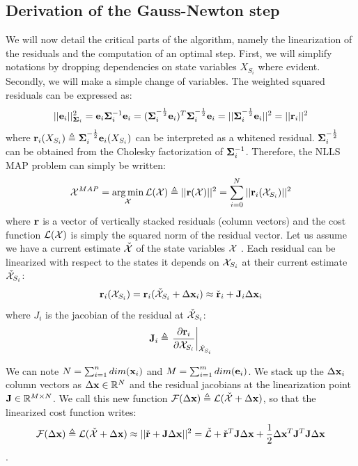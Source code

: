 \subsection{Derivation of the Gauss-Newton step}
We will now detail the critical parts of the algorithm, namely the linearization of the residuals and the computation of an optimal step.
First, we will simplify notations by dropping dependencies on state variables $X_{S_i}$ where evident. 
Secondly, we will make a simple change of variables. The weighted squared residuals can be expressed as:
%
\begin{equation}
    ||{\bf e}_i||^2_{{\bm \Sigma}_i} = {\bf e}_i {\bm \Sigma}_i^{-1} {\bf e}_i 
    = ({\bm \Sigma}_i^{-\frac{1}{2}}{\bf e}_i)^T{\bm \Sigma}_i^{-\frac{1}{2}}{\bf e}_i
    = ||{\bm \Sigma}_i^{-\frac{1}{2}}{\bf e}_i||^2 = ||{\bf r}_i||^2
\end{equation}
%
where ${\bf r}_i(X_{S_i}) \triangleq {\bm \Sigma}_i^{-\frac{1}{2}}{\bf e}_i(X_{S_i})$ can be interpreted as a whitened residual. ${\bm \Sigma}_i^{-\frac{1}{2}}$ can be obtained
from the Cholesky factorization of ${\bm \Sigma}_i^{-1}$. Therefore, the NLLS MAP problem can simply be written:
%
\begin{equation}
    \mathcal{X}^{MAP} = \operatorname*{arg\,min}_{\mathcal{X}} \mathcal{L}(\mathcal{X}) \triangleq||{\bf r}(\mathcal{X})||^2 = \sum_{i=0}^N ||{\bf r}_i({\mathcal{X}_{S_i}})||^2 
\end{equation}
%
where ${\bf r}$ is a vector of vertically stacked residuals (column vectors) and the cost function $\mathcal{L}(\mathcal{X})$ is simply the squared norm 
of the residual vector. Let us assume we have a current estimate $\check{\mathcal{X}}$ of the state variables $\mathcal{X}$ .
Each residual can be linearized with respect to the states it depends on $\mathcal{X}_{S_i}$ at their current estimate $\check{\mathcal{X}}_{S_i}$:
%
\begin{equation}
    {\bf r}_i(\mathcal{X}_{S_i}) = {\bf r}_i(\check{\mathcal{X}}_{S_i} + \Delta {\bf x}_i) \approx \check{{\bf r}}_i + {\bf J}_i \Delta {\bf x}_i
\end{equation}
%
where $J_i$ is the jacobian of the residual at $\check{\mathcal{X}}_{S_i}$: 
%
\begin{equation}
    {\bf J}_i \triangleq \left.\frac{\partial {\bf r}_i}{\partial \mathcal{X}_{S_i}}\right|_{\check{\mathcal{X}}_{S_i}}
    \label{eq:res_jacobian}
\end{equation}

We can note $N = \sum_{i=1}^{n}dim({\bf x}_i)$ and $M = \sum_{i=1}^{m}dim({\bf e}_i)$.
We stack up the $\Delta {\bf x}_i$ column vectors as $\Delta {\bf x} \in \mathbb{R}^N$ and the residual jacobians at the linearization point 
${\bf J} \in \mathbb{R}^{M \times N}$. We call this new function $\mathcal{F}(\Delta {\bf x}) \triangleq \mathcal{L}(\check{\mathcal{X}} + \Delta {\bf x})$, so that the linearized cost function writes:  
%
\begin{equation}
    \mathcal{F}(\Delta {\bf x}) \triangleq \mathcal{L}(\check{\mathcal{X}} + \Delta {\bf x}) 
    \approx ||\check{{\bf r}} + {\bf J} \Delta {\bf x}||^2 
    = \check{\mathcal{L}} +  \check{{\bf r}}^T {\bf J} \Delta {\bf x} + \frac{1}{2}\Delta {\bf x}^T {\bf J}^T {\bf J} \Delta {\bf x}
\end{equation}.

